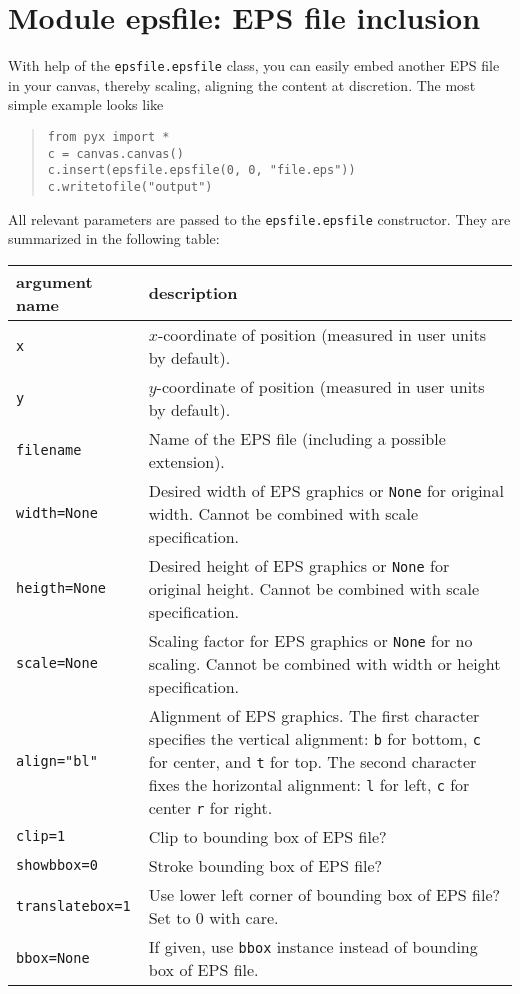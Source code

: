 \chapter{Module epsfile: EPS file inclusion}

With help of the \verb|epsfile.epsfile| class, you can easily embed
another EPS file in your canvas, thereby scaling, aligning the content
at discretion. The most simple example looks like
\begin{quote}
\begin{verbatim}
from pyx import *
c = canvas.canvas()
c.insert(epsfile.epsfile(0, 0, "file.eps"))
c.writetofile("output")
\end{verbatim}
\end{quote}

All relevant parameters are passed to the \verb|epsfile.epsfile|
constructor. They are summarized in the following table:

\medskip
\begin{tabularx}{\linewidth}{l>{\raggedright\arraybackslash}X}
argument name&description\\
\hline
\texttt{x} & $x$-coordinate of position (measured in user
units by default).\\
\texttt{y} & $y$-coordinate of position (measured in user
units by default).\\
\texttt{filename} & Name of the EPS file (including a possible
extension).\\
\texttt{width=None} & Desired width of EPS graphics or \texttt{None}
for original width. Cannot be combined with scale specification.\\
\texttt{heigth=None} & Desired height of EPS graphics or \texttt{None}
for original height. Cannot be combined with scale specification.\\
\texttt{scale=None} & Scaling factor for EPS graphics or \texttt{None}
for no scaling. Cannot be combined with width or height specification.\\
\texttt{align="bl"} & Alignment of EPS graphics. The first character
specifies the vertical alignment: \texttt{b} for bottom, \texttt{c}
for center, and \texttt{t} for top. The second character fixes the
horizontal alignment: \texttt{l} for left, \texttt{c} for center
\texttt{r} for right.\\
\texttt{clip=1} & Clip to bounding box of EPS file?\\
\texttt{showbbox=0} & Stroke bounding box of EPS file?\\
\texttt{translatebox=1} & Use lower left corner of bounding box of EPS
file? Set to $0$ with care.\\
\texttt{bbox=None} & If given, use \texttt{bbox} instance instead of
bounding box of EPS file.
\end{tabularx}



\label{epsfile}


